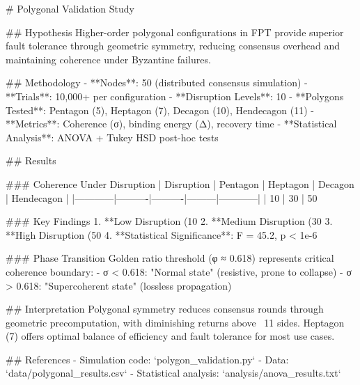 # Polygonal Validation Study  
  
## Hypothesis  
Higher-order polygonal configurations in FPT provide superior fault tolerance   
through geometric symmetry, reducing consensus overhead and maintaining   
coherence under Byzantine failures.  
  
## Methodology  
- **Nodes**: 50 (distributed consensus simulation)  
- **Trials**: 10,000+ per configuration  
- **Disruption Levels**: 10%
- **Polygons Tested**: Pentagon (5), Heptagon (7), Decagon (10), Hendecagon (11)  
- **Metrics**: Coherence (σ), binding energy (Δ), recovery time  
- **Statistical Analysis**: ANOVA + Tukey HSD post-hoc tests  
  
## Results  
  
### Coherence Under Disruption  
| Disruption | Pentagon | Heptagon | Decagon | Hendecagon |  
|------------|----------|----------|---------|------------|  
| 10%
| 30%
| 50%
  
### Key Findings  
1. **Low Disruption (10%
2. **Medium Disruption (30%
3. **High Disruption (50%
4. **Statistical Significance**: F = 45.2, p < 1e-6  
  
### Phase Transition  
Golden ratio threshold (φ ≈ 0.618) represents critical coherence boundary:  
- σ < 0.618: "Normal state" (resistive, prone to collapse)  
- σ > 0.618: "Supercoherent state" (lossless propagation)  
  
## Interpretation  
Polygonal symmetry reduces consensus rounds through geometric precomputation,  
with diminishing returns above ~11 sides. Heptagon (7) offers optimal   
balance of efficiency and fault tolerance for most use cases.  
  
## References  
- Simulation code: `polygon_validation.py`  
- Data: `data/polygonal_results.csv`  
- Statistical analysis: `analysis/anova_results.txt`